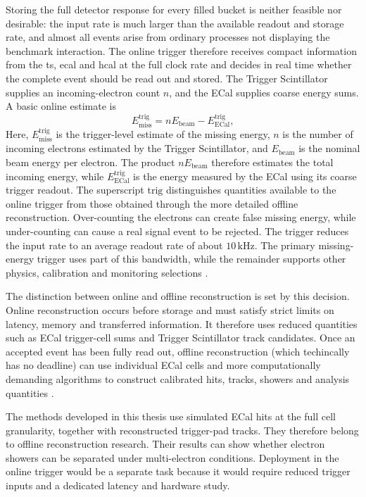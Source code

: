 Storing the full detector response for every filled bucket is neither feasible nor desirable:
the input rate is much larger than the available readout and storage rate,
and almost all events arise from ordinary processes not displaying the benchmark interaction. 
The online trigger
therefore receives compact information from the \gls{ts}, \gls{ecal} and
\gls{hcal} at the full clock rate and decides in real time whether the complete
event should be read out and stored. The Trigger Scintillator supplies an
incoming-electron count \(n\), and the ECal supplies coarse energy sums. A
basic online estimate is
\begin{equation}
    E_{\mathrm{miss}}^{\mathrm{trig}}
    =
    nE_{\mathrm{beam}} - E_{\mathrm{ECal}}^{\mathrm{trig}} ,
\end{equation}
Here, \(E_{\mathrm{miss}}^{\mathrm{trig}}\) is the trigger-level estimate of
the missing energy, \(n\) is the number of incoming electrons estimated by
the Trigger Scintillator, and \(E_{\mathrm{beam}}\) is the nominal beam energy
per electron. The product \(nE_{\mathrm{beam}}\) therefore estimates the total
incoming energy, while \(E_{\mathrm{ECal}}^{\mathrm{trig}}\) is the energy
measured by the ECal using its coarse trigger readout. The superscript
\(\mathrm{trig}\) distinguishes quantities available to the online trigger
from those obtained through the more detailed offline reconstruction.
Over-counting the electrons can create false missing energy, while
under-counting can cause a real signal event to be rejected. The trigger
reduces the input rate to an average readout rate of about
\(10\,\mathrm{kHz}\). The primary missing-energy trigger uses part of this
bandwidth, while the remainder supports other physics, calibration and
monitoring selections \cite{ldmx2025-overview}.

The distinction between online and offline reconstruction is set by this
decision. Online reconstruction occurs before storage and must satisfy strict
limits on latency, memory and transferred information. It therefore uses
reduced quantities such as ECal trigger-cell sums and Trigger Scintillator
track candidates. Once an accepted event has been fully read out, offline
reconstruction (which techincally has no deadline) can use individual ECal cells and more computationally
demanding algorithms to construct calibrated hits, tracks, showers and
analysis quantities \cite{ldmx2025-overview}.


The methods developed in this thesis use simulated ECal hits at the full cell
granularity, together with reconstructed trigger-pad tracks. They
therefore belong to offline reconstruction research. Their results can show
whether electron showers can be separated under multi-electron conditions.
Deployment in the online trigger would be a separate task because it would
require reduced trigger inputs and a dedicated latency and hardware study.


